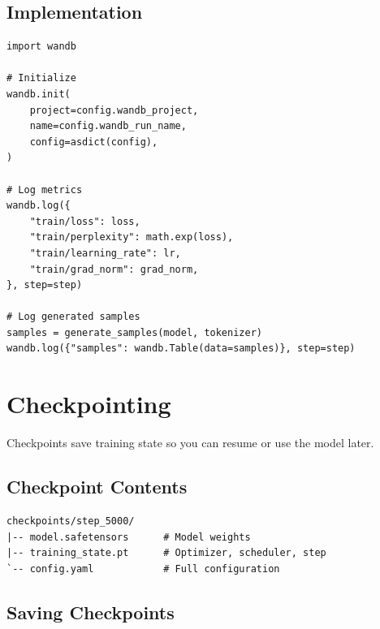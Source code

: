 \subsection{Implementation}

\begin{lstlisting}[style=python, caption={W\&B logging from trainer.py}]
import wandb

# Initialize
wandb.init(
    project=config.wandb_project,
    name=config.wandb_run_name,
    config=asdict(config),
)

# Log metrics
wandb.log({
    "train/loss": loss,
    "train/perplexity": math.exp(loss),
    "train/learning_rate": lr,
    "train/grad_norm": grad_norm,
}, step=step)

# Log generated samples
samples = generate_samples(model, tokenizer)
wandb.log({"samples": wandb.Table(data=samples)}, step=step)
\end{lstlisting}

\section{Checkpointing}

Checkpoints save training state so you can resume or use the model later.

\subsection{Checkpoint Contents}

\begin{lstlisting}[style=shell, numbers=none]
checkpoints/step_5000/
|-- model.safetensors      # Model weights
|-- training_state.pt      # Optimizer, scheduler, step
`-- config.yaml            # Full configuration
\end{lstlisting}

\subsection{Saving Checkpoints}

